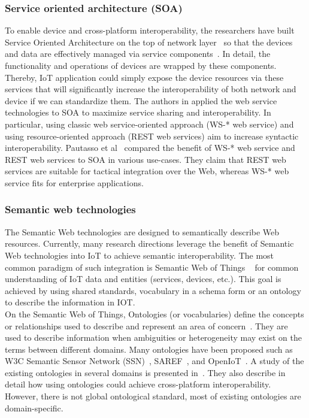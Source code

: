 \subsubsection{Service oriented architecture (SOA)}

To enable device and cross-platform interoperability, the researchers have built Service Oriented Architecture on the top of network layer~\cite{vinoski2003integration} so that the devices and data are effectively managed via service components~\cite{vinoski2003integration}\cite{li2014distributed}. In detail, the functionality and operations of devices are wrapped by these components. Thereby, IoT application could simply expose the device resources via these services that will significantly increase the interoperability of both network and device if we can standardize them. The authors in \cite{papazoglou2007service} applied the web service technologies to SOA to maximize service sharing and interoperability. In particular, \cite{alam2010semantic} using classic web service-oriented approach (WS-* web service) and \cite{varga2017making} using resource-oriented approach (REST web services) aim to increase syntactic interoperability. Pautasso et al~\cite{pautasso2008restful} compared the benefit of WS-* web service and REST web services to SOA in various use-cases. They claim that REST web services are suitable for tactical integration over the Web, whereas WS-* web service fits for enterprise applications.

\subsubsection{Semantic web technologies}

The Semantic Web technologies are designed to semantically describe Web resources. Currently, many research directions leverage the benefit of Semantic Web technologies into IoT to achieve semantic interoperability. The most common paradigm of such integration is Semantic Web of Things ~\cite{scioscia2009building} for common understanding of IoT data and entities (services, devices, etc.). This goal is achieved by using shared standards, vocabulary in a schema form or an ontology to describe the information in IOT. \\

On the Semantic Web of Things, Ontologies (or vocabularies) define the concepts or relationships used to describe and represent an area of concern~\cite{fensel2001ontologies}. They are used to describe information when ambiguities or heterogeneity may exist on the terms between different domains. Many ontologies have been proposed such as W3C Semantic Sensor Network (SSN)~\cite{compton2012ssn}, SAREF~\cite{daniele2015created}, and OpenIoT~\cite{soldatos2015openiot}. A study of the existing ontologies in several domains is presented in~\cite{ganzha2017semantic}. They also describe in detail how using ontologies could achieve cross-platform interoperability. However, there is not global ontological standard, most of existing ontologies are domain-specific.\\

